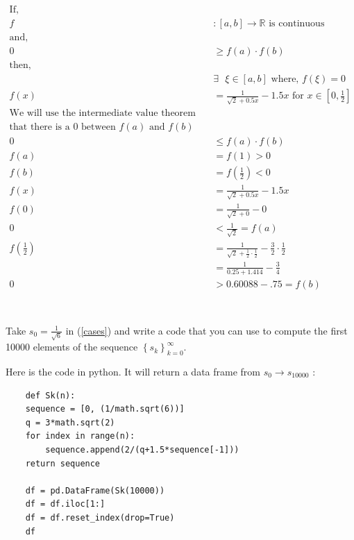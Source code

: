 \documentclass{article}
\begin{document}
\begin{align*}
    \text{If,}&\\
    f&:[a,b] \to \mathbb{R} \text{ is continuous}\\
    \text{and,}&\\
    0 &\ge f(a) \cdot f(b)\\
    \text{then, }&\\
    &\exists \text{ } \xi \in [a,b] \text{ where, }f(\xi)=0 \\
    f(x)&= \frac{1}{\sqrt{2}+0.5x}-1.5x \text{ for }x \in \left[0,\frac{1}{2}\right] \\
    \text{We will use the intermediate value theorem to prove }&\\
    \text{that there is a 0 between $f(a)$ and $f(b)$ }&\\
    0 &\le f(a) \cdot f(b)\\
    f(a)&=f(1)>0\\
    f(b)&=f(\frac{1}{2})<0 \\
    f(x) &= \frac{1}{\sqrt{2}+0.5x}-1.5x\\
    f(0)&= \frac{1}{\sqrt{2}+0}-0\\
    0&< \frac{1}{\sqrt{2}}=f(a)\\
    f\left(\frac{1}{2}\right) &= \frac{1}{\sqrt{2}+\frac{1}{2} \cdot \frac{1}{2}}-\frac{3}{2} \cdot \frac{1}{2}\\
    &= \frac{1}{0.25 + 1.414}-\frac{3}{4}\\
    0&> 0.60088 - .75 =f(b)\\
\end{align*}




\section{}
Take $s_0 = \frac{1}{\sqrt{6}}$ in (\ref{cases}) and write a code that you can use to compute the first 10000 elements of the sequence $\left\{ s_k \right\}^{\infty}_{k=0}$.
\vspace{10mm}


Here is the code in python. It will return a data frame from $s_0\to s_10000$ :
\begin{verbatim}
    def Sk(n):
    sequence = [0, (1/math.sqrt(6))]
    q = 3*math.sqrt(2)
    for index in range(n):
        sequence.append(2/(q+1.5*sequence[-1]))
    return sequence

    df = pd.DataFrame(Sk(10000))
    df = df.iloc[1:]
    df = df.reset_index(drop=True)
    df
\end{verbatim}
\end{document}

